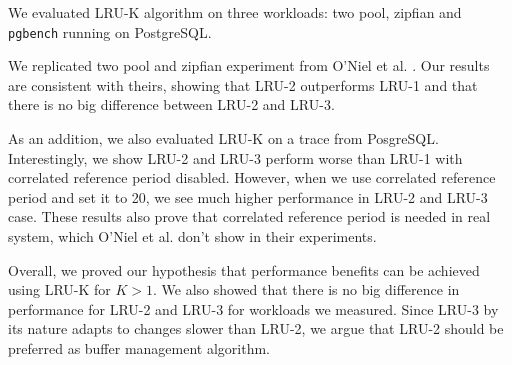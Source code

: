 We evaluated LRU-K algorithm on three workloads: two pool, zipfian and \texttt{pgbench} running on PostgreSQL. 

We replicated two pool and zipfian experiment from O'Niel et al. \cite{lruk}. Our results are consistent with theirs, showing that LRU-2 outperforms LRU-1 and that there is no big difference between LRU-2 and LRU-3.

As an addition, we also evaluated LRU-K on a trace from PosgreSQL. Interestingly, we show LRU-2 and LRU-3 perform worse than LRU-1 with correlated reference period disabled. However, when we use correlated reference period and set it to 20, we see much higher performance in LRU-2 and LRU-3 case. These results also prove that correlated reference period is needed in real system, which O'Niel et al. \cite{lruk} don't show in their experiments.

Overall, we proved our hypothesis that performance benefits can be achieved using LRU-K for $K > 1$. We also showed that there is no big difference in performance for LRU-2 and LRU-3 for workloads we measured. Since LRU-3 by its nature adapts to changes slower than LRU-2, we argue that LRU-2 should be preferred as buffer management algorithm.
